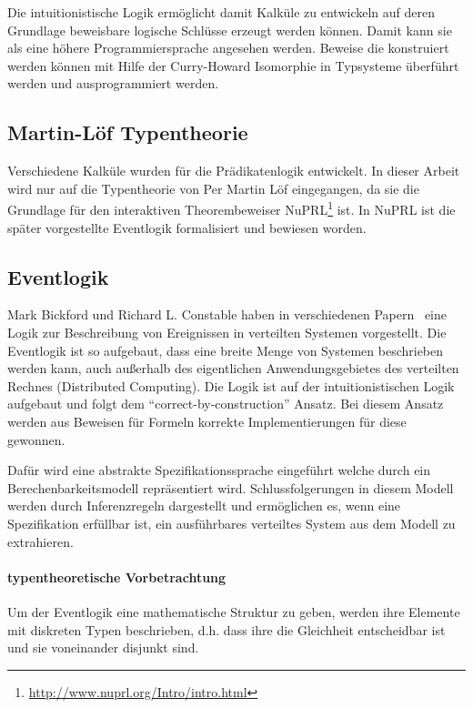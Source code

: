 Die intuitionistische Logik ermöglicht damit Kalküle zu entwickeln auf
deren Grundlage beweisbare logische Schlüsse erzeugt werden können.
Damit kann sie als eine höhere Programmiersprache angesehen werden.
Beweise die konstruiert werden können mit Hilfe der Curry-Howard Isomorphie
in Typsysteme überführt werden und ausprogrammiert werden.~\cite{constable1970constructive}


\subsection{Martin-Löf Typentheorie}
Verschiedene Kalküle wurden für die Prädikatenlogik entwickelt.
In dieser Arbeit wird nur auf die Typentheorie von Per Martin Löf eingegangen,
da sie die Grundlage für den interaktiven Theorembeweiser
NuPRL\footnote{\url{http://www.nuprl.org/Intro/intro.html}} ist. In NuPRL ist
die später vorgestellte Eventlogik formalisiert und bewiesen worden.



\subsection{Eventlogik}

Mark Bickford und Richard L. Constable haben in verschiedenen
Papern~\cite{bickford2003logic, bickford2005causal, bickford2009component} eine Logik zur Beschreibung
von Ereignissen in verteilten Systemen vorgestellt. Die Eventlogik ist so
aufgebaut, dass eine breite Menge von Systemen beschrieben werden kann, auch
außerhalb des eigentlichen Anwendungsgebietes des verteilten Rechnes
(Distributed Computing).  Die Logik ist auf der
intuitionistischen Logik aufgebaut und folgt dem ``correct-by-construction''
Ansatz. Bei diesem Ansatz werden aus Beweisen für Formeln korrekte Implementierungen für
diese gewonnen.~\cite{bates1985proofs}

Dafür wird eine abstrakte Spezifikationssprache eingeführt welche durch
ein Berechenbarkeitsmodell repräsentiert wird.
Schlussfolgerungen in diesem Modell werden durch Inferenzregeln dargestellt und
ermöglichen es, wenn eine Spezifikation erfüllbar ist, ein ausführbares
verteiltes System aus dem Modell zu extrahieren.~\cite{bickford2005causal}


\paragraph{typentheoretische Vorbetrachtung}
Um der Eventlogik eine mathematische Struktur zu geben, werden ihre
Elemente mit diskreten Typen beschrieben, d.h. dass ihre die Gleichheit
entscheidbar ist und sie voneinander disjunkt sind.

